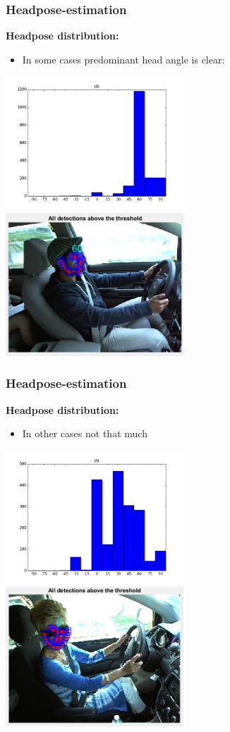 \documentclass{beamer}
\begin{document}
	\begin{frame}
		\frametitle{Headpose-estimation}
        \textbf{Headpose distribution:}
		\begin{itemize}
			\item In some cases predominant head angle is clear:		

		\end{itemize}
		\includegraphics[width=0.5\textwidth]{headpose_evaluation_c0}
		\includegraphics[width=0.5\textwidth]{face1}
	\end{frame}
	
	\begin{frame}
		\frametitle{Headpose-estimation}
        \textbf{Headpose distribution:}
		\begin{itemize}
			\item In other cases not that much
			

		\end{itemize}
		\includegraphics[width=0.5\textwidth]{headpose_evaluation_c9}
		\includegraphics[width=0.5\textwidth]{face6}
	\end{frame}
	
\end{document}
